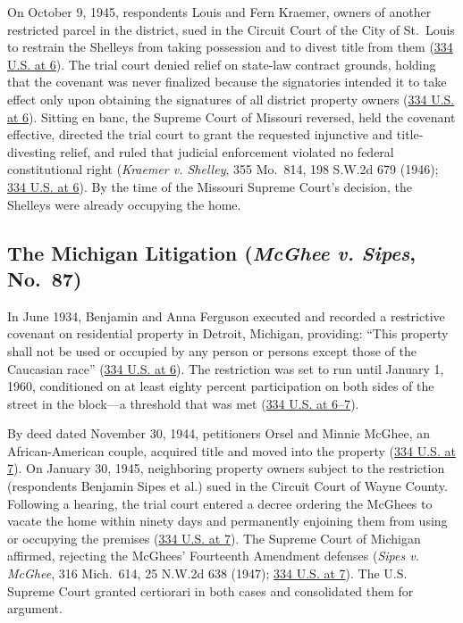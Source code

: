 \documentclass[12pt]{article}
\begin{document}
On October 9, 1945, respondents Louis and Fern Kraemer, owners of another restricted parcel in the district, sued in the Circuit Court of the City of St.~Louis to restrain the Shelleys from taking possession and to divest title from them (\href{https://supreme.justia.com/cases/federal/us/334/1/}{334 U.S. at 6}). The trial court denied relief on state-law contract grounds, holding that the covenant was never finalized because the signatories intended it to take effect only upon obtaining the signatures of all district property owners (\href{https://supreme.justia.com/cases/federal/us/334/1/}{334 U.S. at 6}). Sitting en banc, the Supreme Court of Missouri reversed, held the covenant effective, directed the trial court to grant the requested injunctive and title-divesting relief, and ruled that judicial enforcement violated no federal constitutional right (\textit{Kraemer v. Shelley}, 355 Mo.~814, 198 S.W.2d 679 (1946); \href{https://supreme.justia.com/cases/federal/us/334/1/}{334 U.S. at 6}). By the time of the Missouri Supreme Court's decision, the Shelleys were already occupying the home.

\subsection{The Michigan Litigation (\textit{McGhee v. Sipes}, No.~87)}
In June 1934, Benjamin and Anna Ferguson executed and recorded a restrictive covenant on residential property in Detroit, Michigan, providing: ``This property shall not be used or occupied by any person or persons except those of the Caucasian race'' (\href{https://supreme.justia.com/cases/federal/us/334/1/}{334 U.S. at 6}). The restriction was set to run until January 1, 1960, conditioned on at least eighty percent participation on both sides of the street in the block---a threshold that was met (\href{https://supreme.justia.com/cases/federal/us/334/1/}{334 U.S. at 6--7}).

By deed dated November 30, 1944, petitioners Orsel and Minnie McGhee, an African-American couple, acquired title and moved into the property (\href{https://supreme.justia.com/cases/federal/us/334/1/}{334 U.S. at 7}). On January 30, 1945, neighboring property owners subject to the restriction (respondents Benjamin Sipes et al.) sued in the Circuit Court of Wayne County. Following a hearing, the trial court entered a decree ordering the McGhees to vacate the home within ninety days and permanently enjoining them from using or occupying the premises (\href{https://supreme.justia.com/cases/federal/us/334/1/}{334 U.S. at 7}). The Supreme Court of Michigan affirmed, rejecting the McGhees' Fourteenth Amendment defenses (\textit{Sipes v. McGhee}, 316 Mich.~614, 25 N.W.2d 638 (1947); \href{https://supreme.justia.com/cases/federal/us/334/1/}{334 U.S. at 7}). The U.S. Supreme Court granted certiorari in both cases and consolidated them for argument.
\end{document}
